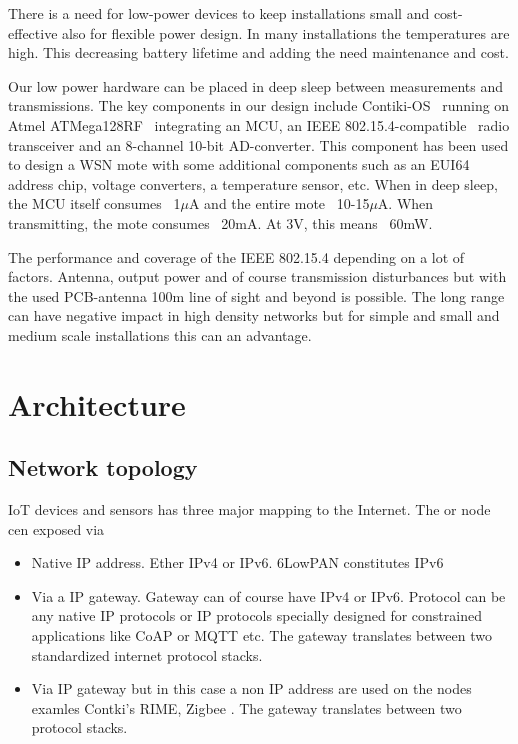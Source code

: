 \documentclass[conference, a4paper,10pt,twocolumn]{IEEEtran}
\begin{document}
There is a need for low-power devices to keep installations small and cost-effective also for 
flexible power design. In many installations the temperatures are high. This decreasing 
battery lifetime and adding the need maintenance and cost.

Our low power hardware can be placed in deep sleep between measurements and transmissions.  The key 
components in our design include  Contiki-OS~\cite{CONTIKI} running on Atmel ATMega128RF~\cite{ATMEGA} 
integrating an MCU, an IEEE 802.15.4-compatible~\cite{802154} radio transceiver and an 8-channel 10-bit 
AD-converter. This component has been used to design a WSN mote with some additional components such 
as an EUI64 address chip, voltage converters, a temperature sensor, etc. When in deep sleep, the MCU 
itself consumes ~1$\mu$A and the entire mote ~10-15$\mu$A. When transmitting, the mote consumes 
~20mA. At 3V, this means ~60mW. 

The performance and coverage of the IEEE 802.15.4 depending on a lot of factors. Antenna, output
power and of course transmission disturbances but with the used PCB-antenna 100m line of sight and 
beyond is possible. The long range can have negative impact in high density networks but for simple 
and small and medium scale installations this can an advantage.


\section{Architecture}
\label{sec:architecture}
 

\subsection{Network topology}

IoT devices and sensors has three major mapping to the Internet. The 
or node cen exposed via

\begin{itemize}

\item Native IP address. Ether IPv4 or IPv6. 6LowPAN constitutes IPv6


\item Via a IP gateway. Gateway can of course have IPv4 or IPv6. Protocol
can be any native IP protocols or IP protocols specially designed 
for constrained applications like CoAP or MQTT etc. The gateway 
translates between two standardized internet protocol stacks. 


\item  Via IP gateway but in this case a non IP address are used on
the nodes examles Contki's RIME, Zigbee . The gateway translates 
between two protocol stacks. 

\end{itemize}
\end{document}

